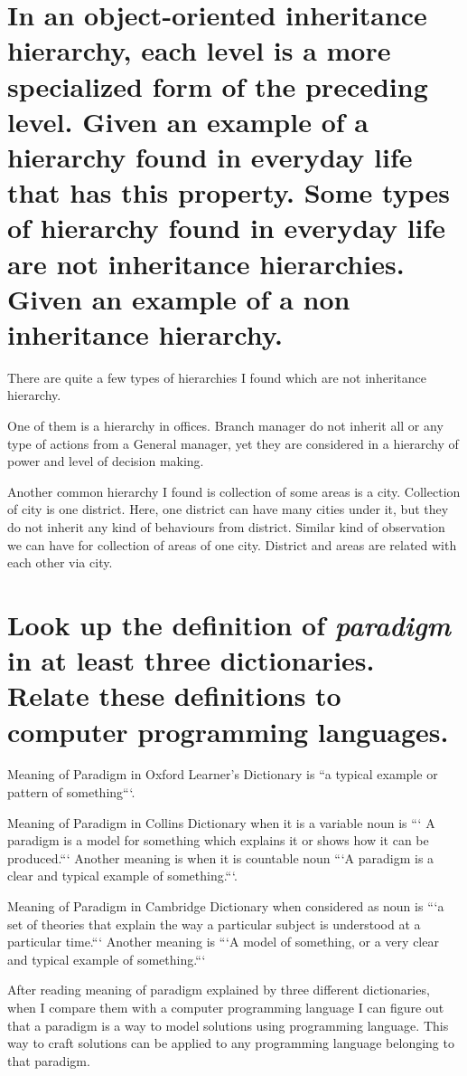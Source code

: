 \section{
    In an object-oriented inheritance hierarchy, each level is a more
    specialized form of the preceding level. Given an example of a hierarchy
    found in everyday life that has this property. Some types of hierarchy
    found in everyday life are not inheritance hierarchies. Given an example
    of a non inheritance hierarchy.
}

There are quite a few types of hierarchies I found which are not inheritance
hierarchy.

One of them is a hierarchy in offices. Branch manager do not inherit all or any
type of actions from a General manager, yet they are considered in a hierarchy
of power and level of decision making.

Another common hierarchy I found is collection of some areas is a city.
Collection of city is one district. Here, one district can have many cities
under it, but they do not inherit any kind of behaviours from district. Similar
kind of observation we can have for collection of areas of one city. District
and areas are related with each other via city.

\section{
  Look up the definition of \textit{paradigm} in at least three dictionaries.
  Relate these definitions to computer programming languages.
}

  Meaning of Paradigm in Oxford Learner's Dictionary
  \cite{paradigm_oxford_learners_dictionary} is ``a typical example or pattern
  of something```.

  Meaning of Paradigm in Collins Dictionary \cite{paradigm_collings_dictionary}
  when it is a variable noun is ``` A paradigm is a model for something which
  explains it or shows how it can be produced.``` Another meaning is when it is
  countable noun ```A paradigm  is a clear and typical example of
  something.```.

  Meaning of Paradigm in Cambridge Dictionary
  \cite{paradigm_cambridge_dictionary} when considered as noun is ```a set of
  theories that explain the way a particular subject is understood at a
  particular time.``` Another meaning is ```A model of something, or a very
  clear and typical example of something.```

  After reading meaning of paradigm explained by three different dictionaries,
  when I compare them with a computer programming language I can figure out
  that a paradigm is a way to model solutions using programming language. This
  way to craft solutions can be applied to any programming language belonging
  to that paradigm.

